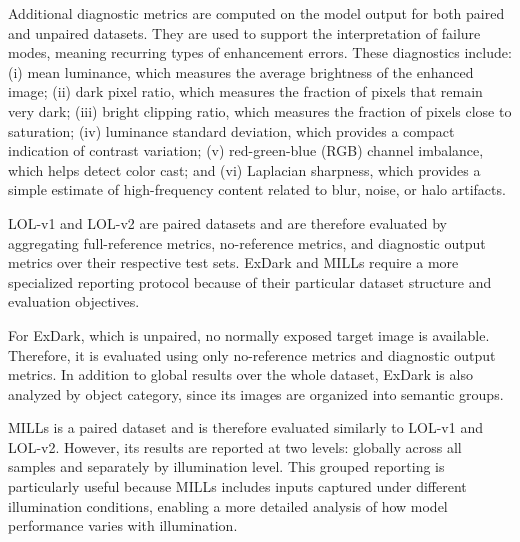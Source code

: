 Additional diagnostic metrics are computed on the model output for both paired and unpaired datasets. They are used to support the interpretation of failure modes, meaning recurring types of enhancement errors. These diagnostics include: (i) mean luminance, which measures the average brightness of the enhanced image; (ii) dark pixel ratio, which measures the fraction of pixels that remain very dark; (iii) bright clipping ratio, which measures the fraction of pixels close to saturation; (iv) luminance standard deviation, which provides a compact indication of contrast variation; (v) red-green-blue (RGB) channel imbalance, which helps detect color cast; and (vi) Laplacian sharpness, which provides a simple estimate of high-frequency content related to blur, noise, or halo artifacts.

LOL-v1 and LOL-v2 are paired datasets and are therefore evaluated by aggregating full-reference metrics, no-reference metrics, and diagnostic output metrics over their respective test sets. ExDark and MILLs require a more specialized reporting protocol because of their particular dataset structure and evaluation objectives.

For ExDark, which is unpaired, no normally exposed target image is available. Therefore, it is evaluated using only no-reference metrics and diagnostic output metrics. In addition to global results over the whole dataset, ExDark is also analyzed by object category, since its images are organized into semantic groups.

MILLs is a paired dataset and is therefore evaluated similarly to LOL-v1 and LOL-v2. However, its results are reported at two levels: globally across all samples and separately by illumination level. This grouped reporting is particularly useful because MILLs includes inputs captured under different illumination conditions, enabling a more detailed analysis of how model performance varies with illumination.